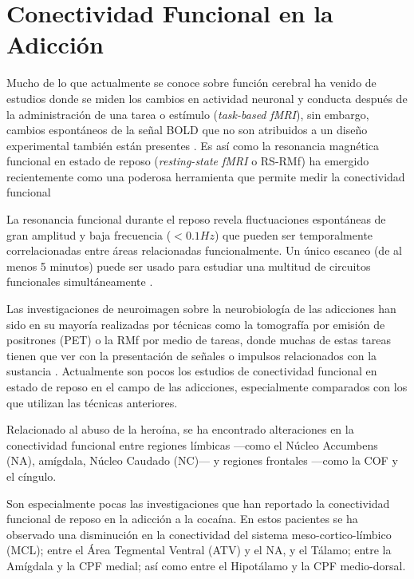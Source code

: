 \section{Conectividad Funcional en la Adicción}
Mucho de lo que actualmente se conoce sobre función cerebral ha venido de estudios donde se miden los cambios en actividad neuronal y conducta después de la administración de una tarea o estímulo (\textit{task-based fMRI}), sin embargo, cambios espontáneos de la señal BOLD que no son atribuidos a un diseño experimental también están presentes \parencite{Fox2007}.
Es así como la resonancia magnética funcional en estado de reposo (\textit{resting-state fMRI} o RS-RMf) ha emergido recientemente como una poderosa herramienta que permite medir la conectividad funcional \parencite{Biswal2010}\par
La resonancia funcional durante el reposo revela fluctuaciones espontáneas de gran amplitud y baja frecuencia ($<0.1 Hz$) que pueden ser temporalmente correlacionadas entre áreas relacionadas funcionalmente.
Un único escaneo (de al menos 5 minutos) puede ser usado para estudiar una multitud de circuitos funcionales simultáneamente \parencite{Biswal2010}.\par
Las investigaciones de neuroimagen sobre la neurobiología de las adicciones han sido en su mayoría realizadas por técnicas como la tomografía por emisión de positrones (PET) o la RMf por medio de tareas, donde muchas de estas tareas tienen que ver con la presentación de señales o impulsos relacionados con la sustancia \parencite{Jasinska2014}. Actualmente son pocos los estudios de conectividad funcional en estado de reposo en el campo de las adicciones, especialmente comparados con los que utilizan las técnicas anteriores. \par
Relacionado al abuso de la heroína, se ha encontrado alteraciones en la conectividad funcional entre regiones límbicas ---como el Núcleo Accumbens (NA), amígdala, Núcleo Caudado (NC)--- y regiones frontales ---como la COF y el cíngulo\parencite{Ma2010,Tianye2015,Wang2010,Zhang2016}.\par
Son especialmente pocas las investigaciones que han reportado la conectividad funcional de reposo en la adicción a la cocaína.
En estos pacientes se ha observado una disminución en la conectividad del sistema meso-cortico-límbico (MCL); entre el Área Tegmental Ventral (ATV) y el NA, y el Tálamo; entre la Amígdala y la CPF medial; así como entre el Hipotálamo y la CPF medio-dorsal.
